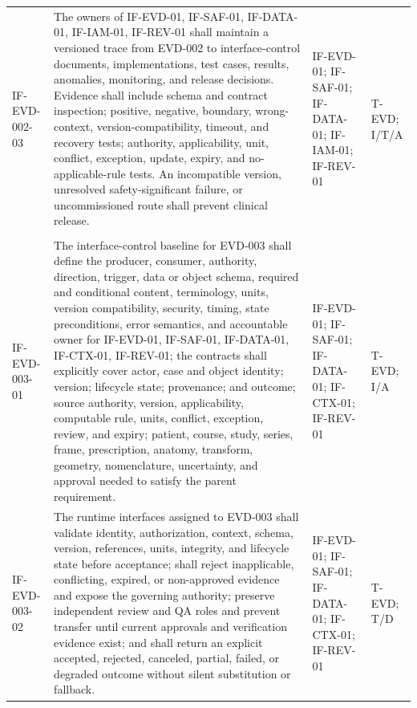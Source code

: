 \documentclass[11pt,letterpaper]{article}
\begin{document}
\begin{scriptsize}
\begin{longtable}{@{}L{0.14\textwidth}L{0.49\textwidth}L{0.19\textwidth}L{0.10\textwidth}@{}}
\addlinespace[2pt]
\mbox{IF-EVD-002-03} & The owners of IF-EVD-01, IF-SAF-01, IF-DATA-01, IF-IAM-01, IF-REV-01 shall maintain a versioned trace from EVD-002 to interface-control documents, implementations, test cases, results, anomalies, monitoring, and release decisions. Evidence shall include schema and contract inspection; positive, negative, boundary, wrong-context, version-compatibility, timeout, and recovery tests; authority, applicability, unit, conflict, exception, update, expiry, and no-applicable-rule tests. An incompatible version, unresolved safety-significant failure, or uncommissioned route shall prevent clinical release. & IF-EVD-01; IF-SAF-01; IF-DATA-01; IF-IAM-01; IF-REV-01 & T-EVD; I\slash\allowbreak{}T\slash\allowbreak{}A \\
\addlinespace[2pt]
 \\
\addlinespace[2pt]
\mbox{IF-EVD-003-01} & The interface-control baseline for EVD-003 shall define the producer, consumer, authority, direction, trigger, data or object schema, required and conditional content, terminology, units, version compatibility, security, timing, state preconditions, error semantics, and accountable owner for IF-EVD-01, IF-SAF-01, IF-DATA-01, IF-CTX-01, IF-REV-01; the contracts shall explicitly cover actor, case and object identity; version; lifecycle state; provenance; and outcome; source authority, version, applicability, computable rule, units, conflict, exception, review, and expiry; patient, course, study, series, frame, prescription, anatomy, transform, geometry, nomenclature, uncertainty, and approval needed to satisfy the parent requirement. & IF-EVD-01; IF-SAF-01; IF-DATA-01; IF-CTX-01; IF-REV-01 & T-EVD; I\slash\allowbreak{}A \\
\addlinespace[2pt]
\mbox{IF-EVD-003-02} & The runtime interfaces assigned to EVD-003 shall validate identity, authorization, context, schema, version, references, units, integrity, and lifecycle state before acceptance; shall reject inapplicable, conflicting, expired, or non-approved evidence and expose the governing authority; preserve independent review and QA roles and prevent transfer until current approvals and verification evidence exist; and shall return an explicit accepted, rejected, canceled, partial, failed, or degraded outcome without silent substitution or fallback. & IF-EVD-01; IF-SAF-01; IF-DATA-01; IF-CTX-01; IF-REV-01 & T-EVD; T\slash\allowbreak{}D \\

\end{longtable}
\end{scriptsize}
\end{document}
